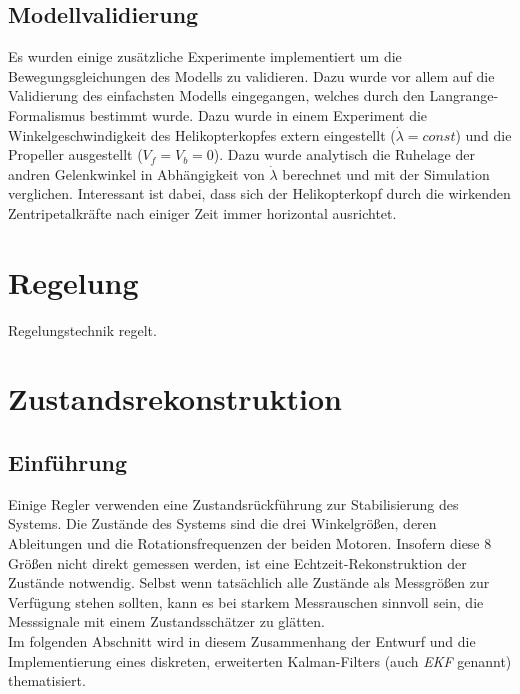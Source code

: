 \documentclass[times, 10pt,twocolumn]{article}
\begin{document}
	\subsection{Modellvalidierung}

	Es wurden einige zusätzliche Experimente implementiert um die Bewegungsgleichungen des Modells zu validieren. Dazu wurde vor allem auf die Validierung des einfachsten Modells eingegangen, welches durch den Langrange-Formalismus bestimmt wurde. Dazu wurde in einem Experiment die Winkelgeschwindigkeit des Helikopterkopfes extern eingestellt ($\dot{\lambda} = const$) und die Propeller ausgestellt ($V_f = V_b = 0$). Dazu wurde analytisch die Ruhelage der andren Gelenkwinkel in Abhängigkeit von $\dot{\lambda}$ berechnet und mit der Simulation verglichen. Interessant ist dabei, dass sich der Helikopterkopf durch die wirkenden Zentripetalkräfte nach einiger Zeit immer horizontal ausrichtet.
	
	\section{Regelung}
	Regelungstechnik regelt. 
	
	\newpage %
	\section{Zustandsrekonstruktion}
	\subsection{Einf\"uhrung}
	Einige Regler verwenden eine Zustandsr\"uckf\"uhrung zur Stabilisierung des Systems. Die Zust\"ande des Systems sind die drei Winkelgr\"oßen, deren Ableitungen und die Rotationsfrequenzen der beiden Motoren. Insofern diese 8 Gr\"oßen nicht direkt gemessen werden, ist eine Echtzeit-Rekonstruktion der Zustände notwendig. 
	Selbst wenn tatsächlich alle Zustände als Messgrößen zur Verfügung stehen sollten, kann es bei starkem Messrauschen sinnvoll sein, die Messsignale mit einem Zustandsschätzer zu glätten. \\
	Im folgenden Abschnitt wird in diesem Zusammenhang der Entwurf und die Implementierung eines diskreten, erweiterten Kalman-Filters (auch \textit{EKF} genannt)  thematisiert. 
\end{document}

